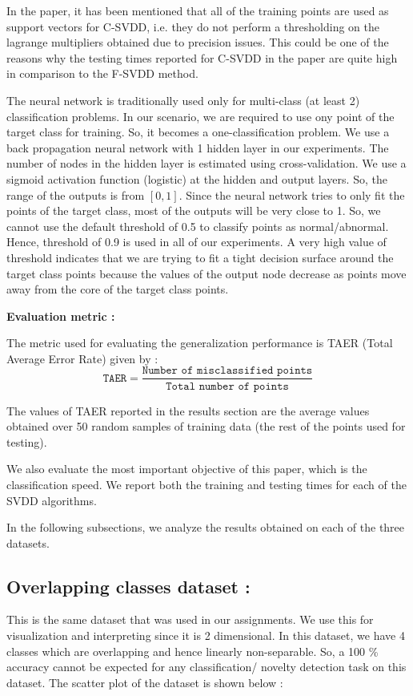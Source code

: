 \documentclass{article} %
\begin{document}
In the paper, it has been mentioned that all of the training points are used as support vectors for C-SVDD, i.e. they do not perform a thresholding on the lagrange multipliers obtained due to precision issues. This could be one of the reasons why the testing times reported for C-SVDD in the paper are quite high in comparison to the F-SVDD method.

The neural network is traditionally used only for multi-class (at least 2) classification problems. In our scenario, we are required to use ony point of the target class for training. So, it becomes a one-classification problem. We use a back propagation neural network with 1 hidden layer in our experiments. The number of nodes in the hidden layer is estimated using cross-validation. We use a sigmoid activation function (logistic) at the hidden and output layers. So, the range of the outputs is from $[0,1]$. Since the neural network tries to only fit the points of the target class, most of the outputs will be very close to 1. So, we cannot use the default threshold of 0.5 to classify points as normal/abnormal. Hence, threshold of 0.9 is used in all of our experiments. A very high value of threshold indicates that we are trying to fit a tight decision surface around the target class points because the values of the output node decrease as points move away from the core of the target class points. 



\textbf{Evaluation metric :}

The metric used for evaluating the generalization performance is  TAER (Total Average Error Rate) given by :
\[ \texttt{TAER} = \frac{\texttt{Number of misclassified points}}{\texttt{Total number of points}} \]

The values of TAER reported in the results section are the average values obtained over 50 random samples of training data (the rest of the points used for testing). 

We also evaluate the most important objective of this paper, which is the classification speed. We report both the training and testing times for each of the SVDD algorithms.

In the following subsections, we analyze the results obtained on each of the three datasets.
\newpage
\subsection{Overlapping classes dataset :} This is the same dataset that was used in our assignments. We use this for visualization and interpreting since it is 2 dimensional. In this dataset, we have 4 classes which are overlapping and hence linearly non-separable. So, a 100 \% accuracy cannot be expected for any classification/ novelty detection task on this dataset.
The scatter plot of the dataset is shown below :
\end{document}
